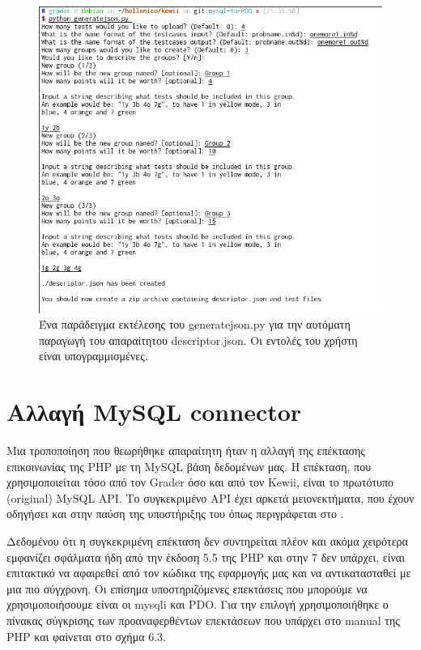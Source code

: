 \documentclass[diploma]{softlab-thesis}
\begin{document}
\begin{figure}
  \centering
  \includegraphics[scale=0.6,trim=4 4 4 4,clip]{Figures/interactive.png}
  \caption[Εκτέλεση διαδραστικού generator αρχείου descriptor.json]{Ένα παράδειγμα
  εκτέλεσης του generatejson.py για την αυτόματη παραγωγή του απαραίτητου
  descriptor.json. Οι εντολές του χρήστη είναι υπογραμμισμένες.}
\end{figure}

\section{Αλλαγή MySQL connector}

Μια τροποποίηση που θεωρήθηκε απαραίτητη ήταν η αλλαγή της επέκτασης
επικοινωνίας της PHP με τη MySQL βάση δεδομένων μας. Η επέκταση, που
χρησιμοποιείται τόσο από τον Grader όσο και από τον Kewii, είναι το πρωτότυπο
(original) MySQL API. Το συγκεκριμένο API έχει αρκετά μειονεκτήματα, που έχουν
οδηγήσει και στην παύση της υποστήριξης του όπως περιγράφεται στο
\cite{deprecation}.

\bigskip

Δεδομένου ότι η συγκεκριμένη επέκταση δεν συντηρείται πλέον και ακόμα χειρότερα
εμφανίζει σφάλματα ήδη από την έκδοση 5.5 της PHP και στην 7 δεν υπάρχει, είναι
επιτακτικό να αφαιρεθεί από τον κώδικα της εφαρμογής μας και να αντικατασταθεί
με μια πιο σύγχρονη. Οι επίσημα υποστηριζόμενες επεκτάσεις που μπορούμε να
χρησιμοποιήσουμε είναι οι mysqli και PDO. Για την επιλογή χρησιμοποιήθηκε ο
πίνακας σύγκρισης των προαναφερθέντων επεκτάσεων που υπάρχει στο manual της PHP
\cite{mysqlapis} και φαίνεται στο σχήμα 6.3.
\end{document}
